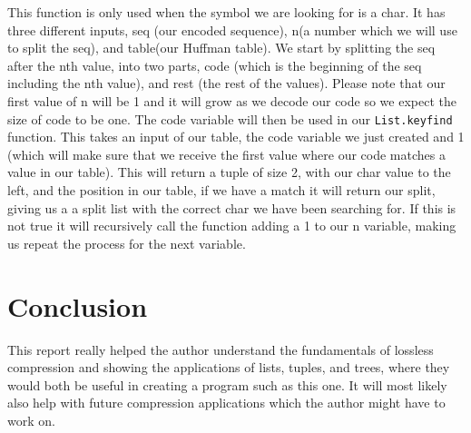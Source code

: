 \documentclass[a4paper,11pt]{article}
\begin{document}
This function is only used when the symbol we are looking for is a char. It has three different inputs, seq (our encoded sequence), n(a number which we will use to split the seq), and table(our Huffman table). We start by splitting the seq after the nth value, into two parts, code (which is the beginning of the seq including the nth value), and rest (the rest of the values). Please note that our first value of n will be 1 and it will grow as we decode our code so we expect the size of code to be one. The code variable will then be used in our {\tt List.keyfind} function. This takes an input of our table, the code variable we just created and 1 (which will make sure that we receive the first value where our code matches a value in our table). This will return a tuple of size 2, with our char value to the left, and the position in our table, if we have a match it will return our split, giving us a a split list with the correct char we have been searching for. If this is not true it will recursively call the function adding a 1 to our n variable, making us repeat the process for the next variable.


\section*{Conclusion}

This report really helped the author understand the fundamentals of lossless compression and showing the applications of lists, tuples, and trees, where they would both be useful in creating a program such as this one. It will most likely also help with future compression applications which the author might have to work on.
\end{document}
